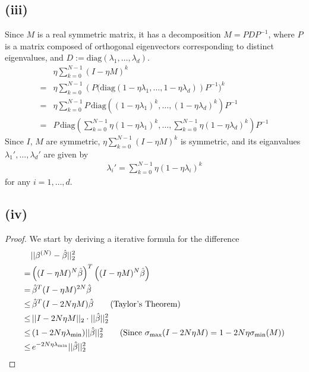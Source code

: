 \documentclass[twoside,11pt]{homework}
\begin{document}
\subsection*{(iii)}
	Since $M$ is a real symmetric matrix, it has a decomposition $M = P D P^{-1}$, 
	where $P$ is a matrix composed of orthogonal eigenvectors corresponding to distinct eigenvalues,
	and $D:= \text{diag}(\lambda_1,\dots, \lambda_d)$.
	\begin{align*}
		&\eta \sum_{k=0}^{N-1} (I-\eta M)^k \\
		=&\eta \sum_{k=0}^{N-1} \left(P(\text{diag} \left( 1- \eta \lambda_1, \dots, 1- \eta \lambda_d
		\right) \right)P^{-1})^k \tag{$I-\eta M$ is symmetric} \\
		=&\eta \sum_{k=0}^{N-1} P \,
		\text{diag} \left( (1- \eta \lambda_1)^k, \dots, (1- \eta \lambda_d)^k \right) P^{-1} \\
		=& P \, \text{diag} \left( \sum_{k=0}^{N-1} \eta(1- \eta \lambda_1)^k, 
		\dots, \sum_{k=0}^{N-1} \eta(1- \eta \lambda_d)^k \right) P^{-1}
	\end{align*}
	Since $I$, $M$ are symmetric, $\eta \sum_{k=0}^{N-1} (I-\eta M)^k$ is symmetric, 
	and its eiganvalues $\lambda_1',\dots, \lambda_d'$ are given by
	\begin{align*}
		\lambda_i' = \sum_{k=0}^{N-1} \eta(1- \eta \lambda_i)^k
	\end{align*}
	for any $i=1,\dots,d$.
\subsection*{(iv)}
	\begin{proof}
	We start by deriving a iterative formula for the difference
	\begin{align*}
		& ||\beta^{(N)} - \hat{\beta}||_2^2 \\
		=& \left( (I-\eta M)^N \hat\beta \right)^T \left( (I-\eta M)^N \hat\beta \right) \\
		=& \, \hat\beta^T (I-\eta M)^{2N} \hat\beta \\
		\leq& \, \hat\beta^T (I-2N\eta M) \hat\beta \tag{Taylor's Theorem} \\
		\leq& \, || I-2N\eta M ||_2 \cdot ||\hat{\beta}||_2^2 \\
		\leq & \, (1-2N\eta \lambda_{\text{min}}) ||\hat{\beta}||_2^2 
		\tag{Since $\sigma_{\text{max}}(I-2N\eta M) = 1-2N\eta \sigma_{\text{min}}(M)$} \\
		\leq& \, e^{-2N\eta\lambda_{\text{min}}}||\hat{\beta}||_2^2 
	\end{align*}
	\end{proof}
\end{document}
